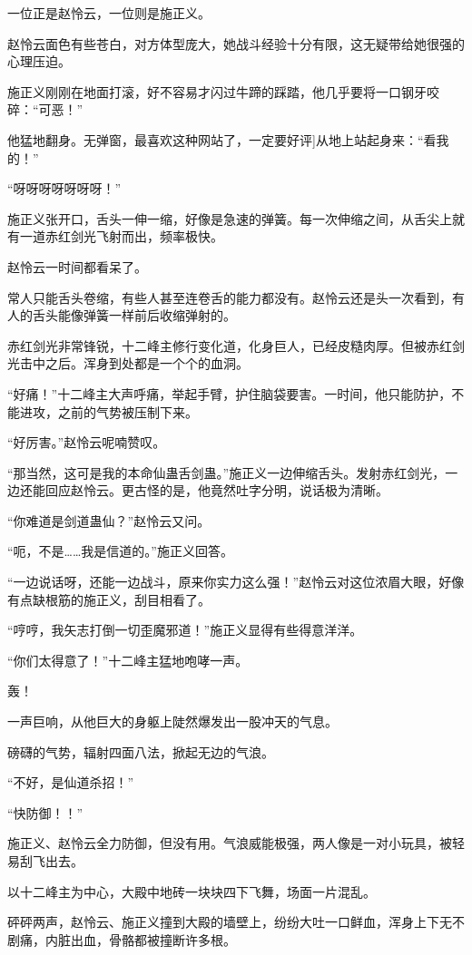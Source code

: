 \begin{this_body}
一位正是赵怜云，一位则是施正义。

赵怜云面色有些苍白，对方体型庞大，她战斗经验十分有限，这无疑带给她很强的心理压迫。

施正义刚刚在地面打滚，好不容易才闪过牛蹄的踩踏，他几乎要将一口钢牙咬碎：“可恶！”

他猛地翻身。无弹窗，最喜欢这种网站了，一定要好评]从地上站起身来：“看我的！”

“呀呀呀呀呀呀呀！”

施正义张开口，舌头一伸一缩，好像是急速的弹簧。每一次伸缩之间，从舌尖上就有一道赤红剑光飞射而出，频率极快。

赵怜云一时间都看呆了。

常人只能舌头卷缩，有些人甚至连卷舌的能力都没有。赵怜云还是头一次看到，有人的舌头能像弹簧一样前后收缩弹射的。

赤红剑光非常锋锐，十二峰主修行变化道，化身巨人，已经皮糙肉厚。但被赤红剑光击中之后。浑身到处都是一个个的血洞。

“好痛！”十二峰主大声呼痛，举起手臂，护住脑袋要害。一时间，他只能防护，不能进攻，之前的气势被压制下来。

“好厉害。”赵怜云呢喃赞叹。

“那当然，这可是我的本命仙蛊舌剑蛊。”施正义一边伸缩舌头。发射赤红剑光，一边还能回应赵怜云。更古怪的是，他竟然吐字分明，说话极为清晰。

“你难道是剑道蛊仙？”赵怜云又问。

“呃，不是……我是信道的。”施正义回答。

“一边说话呀，还能一边战斗，原来你实力这么强！”赵怜云对这位浓眉大眼，好像有点缺根筋的施正义，刮目相看了。

“哼哼，我矢志打倒一切歪魔邪道！”施正义显得有些得意洋洋。

“你们太得意了！”十二峰主猛地咆哮一声。

轰！

一声巨响，从他巨大的身躯上陡然爆发出一股冲天的气息。

磅礴的气势，辐射四面八法，掀起无边的气浪。

“不好，是仙道杀招！”

“快防御！！”

施正义、赵怜云全力防御，但没有用。气浪威能极强，两人像是一对小玩具，被轻易刮飞出去。

以十二峰主为中心，大殿中地砖一块块四下飞舞，场面一片混乱。

砰砰两声，赵怜云、施正义撞到大殿的墙壁上，纷纷大吐一口鲜血，浑身上下无不剧痛，内脏出血，骨骼都被撞断许多根。


\end{this_body}
